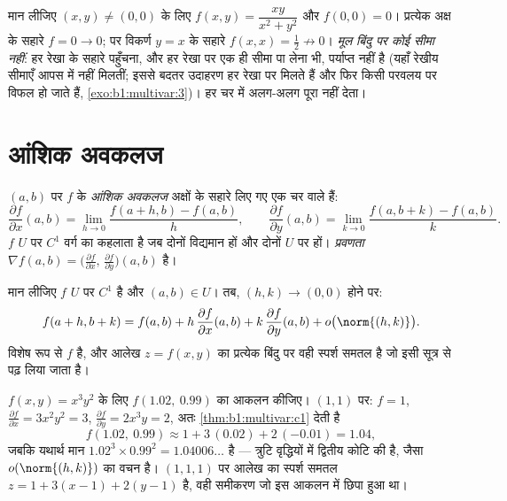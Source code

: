 \begin{example}[त्रिज्य फंदा]\label{ex:b1:multivar:trap}
मान लीजिए $(x,y) \neq (0,0)$ के लिए $f(x, y) = \dfrac{xy}{x^2 + y^2}$ और
$f(0, 0) = 0$। प्रत्येक अक्ष के सहारे $f = 0 \to 0$; पर विकर्ण $y = x$ के
सहारे $f(x, x) = \frac12 \not\to 0$। \emph{मूल बिंदु पर कोई सीमा नहीं}: हर
रेखा के सहारे पहुँचना, और हर रेखा पर एक ही सीमा पा लेना भी, पर्याप्त नहीं
है (यहाँ रेखीय सीमाएँ आपस में नहीं मिलतीं; इससे बदतर उदाहरण हर रेखा पर
मिलते हैं और फिर किसी परवलय पर विफल हो जाते हैं,
\cref{exo:b1:multivar:3})। हर चर में अलग-अलग  पूरा  नहीं
देता।
\end{example}

\section{आंशिक अवकलज}

\begin{definition}\label{def:b1:multivar:partial}
$(a, b)$ पर $f$ के \emph{आंशिक अवकलज} अक्षों के सहारे
लिए गए एक चर वाले  हैं:
\[
\frac{\partial f}{\partial x}(a,b)
= \lim_{h \to 0} \frac{f(a + h, b) - f(a,b)}{h},
\qquad
\frac{\partial f}{\partial y}(a,b)
= \lim_{k \to 0} \frac{f(a, b + k) - f(a,b)}{k}.
\]
$f$ $U$ पर $C^1$ वर्ग का कहलाता है जब दोनों विद्यमान हों और दोनों $U$ पर
 हों। \emph{प्रवणता} $\nabla f(a,b) =
\bigl(\frac{\partial f}{\partial x},\, \frac{\partial f}{\partial
y}\bigr)(a,b)$ है।
\end{definition}

\begin{theorem}[$C^1$ से स्पर्श समतल]\label{thm:b1:multivar:c1}
मान लीजिए $f$ $U$ पर $C^1$ है और $(a,b) \in U$। तब, $(h, k) \to (0,0)$
होने पर:
\[
f(a + h, b + k) = f(a, b)
+ h\,\frac{\partial f}{\partial x}(a,b)
+ k\,\frac{\partial f}{\partial y}(a,b)
+ o\bigl(\norm{(h,k)}\bigr) .
\]
विशेष रूप से $f$  है, और आलेख $z = f(x,y)$ का प्रत्येक बिंदु पर वही
स्पर्श समतल है जो इसी सूत्र से पढ़ लिया जाता है।
\end{theorem}

\begin{example}[रैखिक सन्निकटन, काम पर]
\label{ex:b1:multivar:linapprox}
$f(x, y) = x^3y^2$ के लिए $f(1.02,\ 0.99)$ का आकलन कीजिए। $(1, 1)$ पर:
$f = 1$, $\frac{\partial f}{\partial x} = 3x^2y^2 = 3$,
$\frac{\partial f}{\partial y} = 2x^3y = 2$, अतः
\cref{thm:b1:multivar:c1} देती है
\[
f(1.02,\ 0.99) \approx 1 + 3\,(0.02) + 2\,(-0.01) = 1.04 ,
\]
जबकि यथार्थ मान $1.02^3 \times 0.99^2 = 1.04006\dots$ है --- त्रुटि
वृद्धियों में द्वितीय कोटि की है, जैसा $o(\norm{(h,k)})$ का वचन है।
$(1, 1, 1)$ पर आलेख का स्पर्श समतल $z = 1 + 3(x - 1) + 2(y - 1)$ है, वही
समीकरण जो इस आकलन में छिपा हुआ था।
\end{example}

